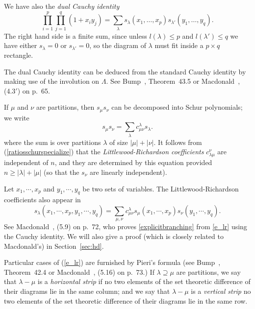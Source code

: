 \documentclass[11pt]{amsart}
\newcommand{\tmem}[1]{{\em #1\/}}
\begin{document}
We have also the {\tmem{dual Cauchy identity}}
\begin{equation}
\label{ratiosdualcauchy} \prod_{i = 1}^p \prod_{j = 1}^q ( 1 + x_i
y_j ) = \sum_{\lambda} s_{\lambda} ( x_1, \ldots, x_p )
s_{\lambda'} ( y_1, \ldots, y_q ) .
\end{equation}
The right hand side is a finite sum, since unless $l ( \lambda )
\leqslant p$ and $l ( \lambda' ) \leqslant q$ we have either
$s_{\lambda} = 0$ or $s_{\lambda'} = 0$, so the diagram of
$\lambda$ must fit inside a $p \times q$ rectangle.

The dual Cauchy identity can be deduced from the standard Cauchy
identity by making use of the involution on $\Lambda$.
See Bump~{\cite{DB}},
Theorem~43.5 or Macdonald~{\cite{Mac}}, (4.3$'$) on p.~65.

If $\mu$ and $\nu$ are partitions, then $s_{\mu} s_{\nu}$ can be
decomposed into Schur polynomials; we write
\begin{equation} \label{e_lr} s_{\mu}s_{\nu}=\sum_{\lambda}
c^{\lambda}_{\mu \nu} s_{\lambda}.
\end{equation}
where the sum is over partitions $\lambda$ of size $| \mu | + |
\nu |$. It follows from (\ref{ratiosschurspecialize}) that the
{\tmem{Littlewood-Richardson coefficients}} $c_{\lambda
\mu}^{\nu}$ are independent of $n$, and they are determined by
this equation provided $n \geqslant | \lambda | + | \mu |$ (so
that the $s_{\nu}$ are linearly independent).

Let $x_1, \cdots, x_p$ and $y_1, \cdots, y_q$ be two sets of
variables. The Littlewood-Richardson coefficients also appear in
\begin{equation}
   \label{explicitbranching} s_{\lambda} ( x_1, \cdots, x_p, y_1, \cdots, y_q
   ) = \sum_{\mu, \nu} c_{\mu \nu}^{\lambda} s_{\mu} ( x_1, \cdots, x_p )
   s_{\nu} ( y_1, \cdots, y_q ) .
\end{equation}
See Macdonald~\cite{Mac}, (5.9) on p.~72, who proves
\eqref{explicitbranching} from \eqref{e_lr} using the Cauchy
identity. We will also give a proof (which is closely related to
Macdonald's) in Section~\ref{sec:hd}.

Particular cases of (\ref{e_lr}) are furnished by  Pieri's formula
(see Bump~{\cite{DB}}, Theorem~42.4 or Macdonald~{\cite{Mac}},
(5.16) on p.~73.)
  If $\lambda \supseteq \mu$ are partitions, we say that
$\lambda - \mu$ is a {\tmem{horizontal strip}} if no two elements
of the set theoretic difference of their diagrams lie in the same
column; and we say that $\lambda - \mu$ is a {\tmem{vertical
strip}} no two elements of the set theoretic difference of their
diagrams lie in the same row.
\end{document}
